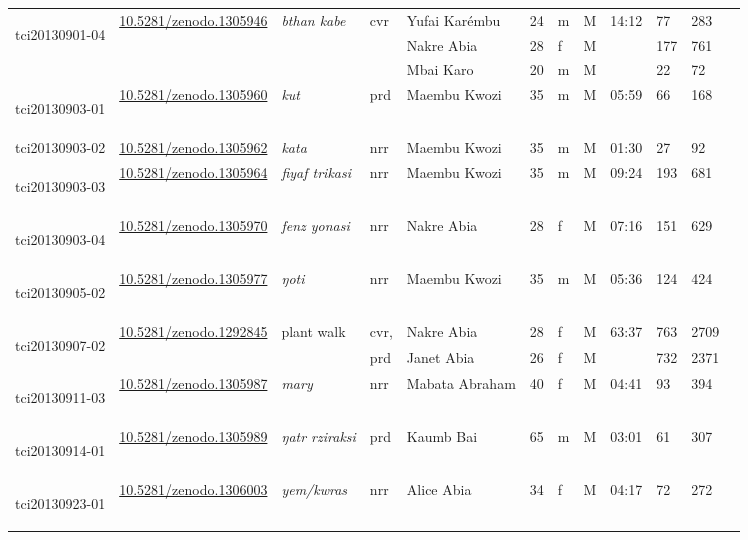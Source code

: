 \begin{landscape}
{\begin{longtable}{p{}lllllllllll}
	\multirow{3}{*}{\hypertarget{tci20130901-04}{tci20130901-04}} &\multirow{3}{*}{\href{https://zenodo.org/record/1305946}{10.5281/zenodo.1305946}}& \multirow{3}{*}{\emph{bthan kabe}} & \multirow{3}{*}{cvr} & Yufai Karémbu & 24 & m & M & \multirow{3}{*}{14:12} & 77&283\\
	&&&&Nakre Abia&28&f&M&&177&761\\
	&&&&Mbai Karo&20&m&M&&22&72\\\hline
	\hypertarget{tci20130903-01}{tci20130903-01} &\href{https://zenodo.org/record/1305960}{10.5281/zenodo.1305960}& \emph{kut} & prd & Maembu Kwozi & 35 & m & M & 05:59 & 66&168\\\hline
	tci20130903-02 &\href{https://zenodo.org/record/1305962}{10.5281/zenodo.1305962}& \emph{kata} & nrr & Maembu Kwozi & 35 & m & M & 01:30 & 27&92\\\hline
	\hypertarget{tci20130903-03}{tci20130903-03} &\href{https://zenodo.org/record/1305964}{10.5281/zenodo.1305964}& \emph{fiyaf trikasi} & nrr & Maembu Kwozi & 35 & m & M & 09:24 & 193&681\\\hline
	\hypertarget{tci20130903-04}{tci20130903-04} &\href{https://zenodo.org/record/1305970}{10.5281/zenodo.1305970}& \emph{fenz yonasi} & nrr & Nakre Abia & 28 & f & M & 07:16 & 151&629\\\hline
	\hypertarget{tci20130905-02}{tci20130905-02} &\href{https://zenodo.org/record/1305977}{10.5281/zenodo.1305977}& \emph{ŋoti} & nrr & Maembu Kwozi & 35 & m & M & 05:36 & 124&424\\\hline
	\multirow{2}{*}{\hypertarget{tci20130907-02}{tci20130907-02}} &\multirow{2}{*}{\href{https://zenodo.org/record/1292845}{10.5281/zenodo.1292845}}& \multirow{2}{*}{plant walk} & cvr, & Nakre Abia & 28 & f & M & \multirow{2}{*}{63:37} & 763&2709\\
	&&&prd& Janet Abia &26&f&M&&732&2371\\\hline
	\hypertarget{tci20130911-03}{tci20130911-03} &\href{https://zenodo.org/record/1305987}{10.5281/zenodo.1305987} &\emph{mary} & nrr & Mabata Abraham & 40 & f & M & 04:41 & 93&394\\\hline
	\hypertarget{tci20130914-01}{tci20130914-01} &\href{https://zenodo.org/record/1305989}{10.5281/zenodo.1305989}& \emph{ŋatr rziraksi} & prd & Kaumb Bai & 65 & m & M & 03:01 & 61&307\\\hline
	\hypertarget{tci20130923-01}{tci20130923-01} &\href{https://zenodo.org/record/1306003}{10.5281/zenodo.1306003}& \emph{yem/kwras} & nrr & Alice Abia & 34 & f & M & 04:17 & 72&272\\\hline

\end{longtable}}
\end{landscape}
